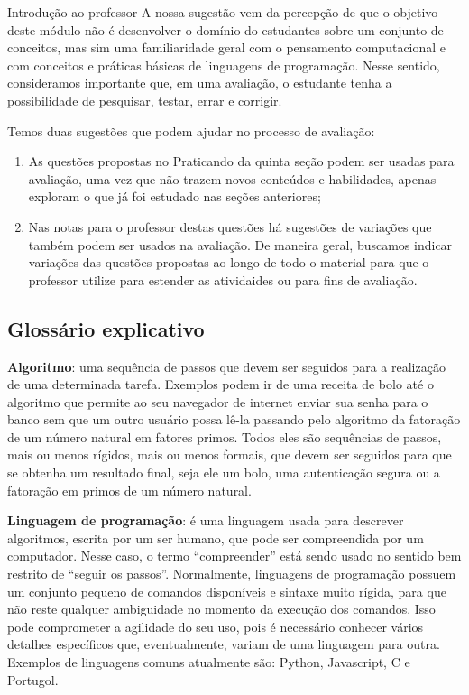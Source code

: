 \begin{apresentacao}{Introdução ao professor}
A nossa sugestão vem da percepção de que o objetivo deste módulo não é desenvolver o domínio do estudantes sobre um conjunto de conceitos, mas sim uma familiaridade geral com o pensamento computacional e com conceitos e práticas básicas de linguagens de programação. Nesse sentido, consideramos importante que, em uma avaliação, o estudante tenha a possibilidade de pesquisar, testar, errar e corrigir.

Temos duas sugestões que podem ajudar no processo de avaliação:

\begin{enumerate}
\item As questões propostas no Praticando da quinta seção podem ser usadas para avaliação, uma vez que não trazem novos conteúdos e habilidades, apenas exploram o que já foi estudado nas seções anteriores;
\item Nas notas para o professor destas questões há sugestões de variações que também podem ser usados na avaliação. De maneira geral, buscamos indicar variações das questões propostas ao longo de todo o material para que o professor utilize para estender as atividaides ou para fins de avaliação.
\end{enumerate}

\subsection{Glossário explicativo}

\textbf{Algoritmo}: uma sequência de passos que devem ser seguidos para a realização de uma determinada tarefa. Exemplos podem ir de uma receita de bolo até o algoritmo que permite ao seu navegador de internet enviar sua senha para o banco sem que um outro usuário possa lê-la passando pelo algoritmo da fatoração de um número natural em fatores primos. Todos eles são sequências de passos, mais ou menos rígidos, mais ou menos formais, que devem ser seguidos para que se obtenha um resultado final, seja ele um bolo, uma autenticação segura ou a fatoração em primos de um número natural.

\textbf{Linguagem de programação}: é uma linguagem usada para descrever algoritmos, escrita por um ser humano, que pode ser compreendida por um computador. Nesse caso, o termo “compreender” está sendo usado no sentido bem restrito de “seguir os passos”. Normalmente, linguagens de programação possuem um conjunto pequeno de comandos disponíveis e sintaxe muito rígida, para que não reste qualquer ambiguidade no momento da execução dos comandos. Isso pode comprometer a agilidade do seu uso, pois é necessário conhecer vários detalhes específicos que, eventualmente, variam de uma linguagem para outra. Exemplos de linguagens comuns atualmente são: Python, Javascript, C e Portugol.


\end{apresentacao}
